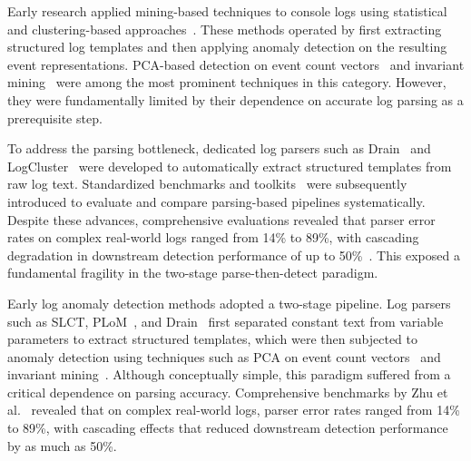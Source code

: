 
Early research applied mining-based techniques to console logs using statistical and clustering-based approaches~\cite{xu2009detecting, lou2010mining, makanju2009clustering}. These methods operated by first extracting structured log templates and then applying anomaly detection on the resulting event representations. PCA-based detection on event count vectors~\cite{xu2009detecting} and invariant mining~\cite{lou2010mining} were among the most prominent techniques in this category. However, they were fundamentally limited by their dependence on accurate log parsing as a prerequisite step.

To address the parsing bottleneck, dedicated log parsers such as Drain~\cite{he2017drain} and LogCluster~\cite{vaarandi2015logcluster} were developed to automatically extract structured templates from raw log text. Standardized benchmarks and toolkits~\cite{zhu2019tools} were subsequently introduced to evaluate and compare parsing-based pipelines systematically. Despite these advances, comprehensive evaluations revealed that parser error rates on complex real-world logs ranged from 14\% to 89\%, with cascading degradation in downstream detection performance of up to 50\%~\cite{zhu2019tools}. This exposed a fundamental fragility in the two-stage parse-then-detect paradigm.

Early log anomaly detection methods adopted a two-stage pipeline. Log parsers such as SLCT, PLoM~\cite{makanju2009clustering}, and Drain~\cite{he2017drain} first separated constant text from variable parameters to extract structured templates, which were then subjected to anomaly detection using techniques such as PCA on event count vectors~\cite{xu2009detecting} and invariant mining~\cite{lou2010mining}. Although conceptually simple, this paradigm suffered from a critical dependence on parsing accuracy. Comprehensive benchmarks by Zhu et al.~\cite{zhu2019tools} revealed that on complex real-world logs, parser error rates ranged from 14\% to 89\%, with cascading effects that reduced downstream detection performance by as much as 50\%.


